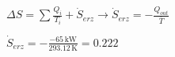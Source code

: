 \( \Delta S = \sum \frac{Q_i}{T_i} + \dot{S}_{erz} \rightarrow \dot{S}_{erz} = -\frac{Q_{out}}{\bar{T}} \)  

\( \dot{S}_{erz} = -\frac{-65 \, \text{kW}}{293.12 \, \text{K}} = 0.222 \)